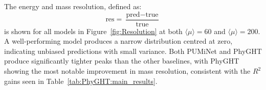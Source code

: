 \begin{table}[h]
	\centering
	\caption{$R^2$ for energy ($E_{frac}$) and mass ($M_{frac}$) correction at $\langle\mu\rangle \in \{60, 200\}$.}
	\label{tab:PhyGHT:main_results}
\end{table}

The energy and mass resolution, defined as:
\begin{equation}
    \text{res} = \frac{\text{pred} - \text{true}}{\text{true}}
\end{equation}
is shown for all models in Figure~\ref{fig:Resolution} at both $\langle\mu\rangle=60$ and $\langle\mu\rangle=200$. 
A well-performing model produces a narrow distribution centred at zero, indicating unbiased predictions with small variance. 
Both PUMiNet and PhyGHT produce significantly tighter peaks than the other baselines, with PhyGHT showing the most notable improvement in mass resolution, consistent with the $R^2$ gains seen in Table~\ref{tab:PhyGHT:main_results}.

